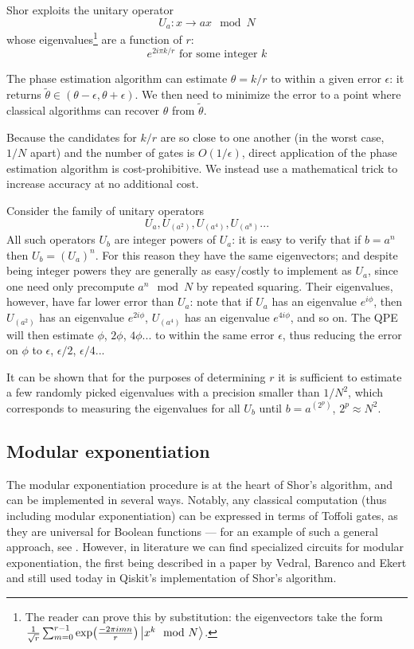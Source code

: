 \documentclass[conference]{IEEEtran}
\begin{document}
Shor exploits the unitary operator
\begin{equation}
U_a: x \rightarrow ax \mod N
\end{equation}
whose eigenvalues\footnote{The reader can prove this by substitution: the eigenvectors take the form $\frac{1}{\sqrt{r}}\sum_{m=0}^{r-1}\exp(\frac{-2\pi i m n}{r})\ket{x^k \mod N}$.} are a function of $r$:
\begin{equation}
e^{2i\pi k/r}\text{ for some integer }k
\end{equation}

The phase estimation algorithm can estimate $\theta=k/r$ to within a given error $\epsilon$: it returns $\widetilde\theta \in (\theta-\epsilon, \theta+\epsilon)$. We then need to minimize the error to a point where classical algorithms can recover $\theta$ from $\widetilde\theta$.

Because the candidates for $k/r$ are so close to one another (in the worst case, $1/N$ apart) and the number of gates is $O(1/\epsilon)$, direct application of the phase estimation algorithm is cost-prohibitive. We instead use a mathematical trick to increase accuracy at no additional cost.

Consider the family of unitary operators
\begin{equation}
U_a, U_{(a^2)}, U_{(a^4)}, U_{(a^8)}...
\end{equation}
All such operators $U_b$ are integer powers of $U_a$: it is easy to verify that if $b = a^n$ then $U_b = (U_a)^n$. For this reason they have the same eigenvectors; and despite being integer powers they are generally as easy/costly to implement as $U_a$, since one need only precompute $a^n \mod N$ by repeated squaring. Their eigenvalues, however, have far lower error than $U_a$: note that if $U_a$ has an eigenvalue $e^{i\phi}$, then $U_{(a^2)}$ has an eigenvalue $e^{2i\phi}$, $U_{(a^4)}$ has an eigenvalue $e^{4i\phi}$, and so on. The QPE will then estimate $\phi$, $2\phi$, $4\phi$... to within the same error $\epsilon$, thus reducing the error on $\phi$ to $\epsilon$, $\epsilon/2$, $\epsilon/4$...

It can be shown that for the purposes of determining $r$ it is sufficient to estimate a few randomly picked eigenvalues with a precision smaller than $1/N^2$, which corresponds to measuring the eigenvalues for all $U_b$ until $b=a^{(2^p)}$, $2^p \approx N^2$.

\subsection{Modular exponentiation}
The modular exponentiation procedure is at the heart of Shor's algorithm, and can be implemented in several ways. Notably, any classical computation (thus including modular exponentiation) can be expressed in terms of Toffoli gates, as they are universal for Boolean functions --- for an example of such a general approach, see \cite{toffoli}. However, in literature we can find specialized circuits for modular exponentiation, the first being described in a paper \cite{vbe} by Vedral, Barenco and Ekert and still used today in Qiskit's implementation of Shor's algorithm.
\end{document}
